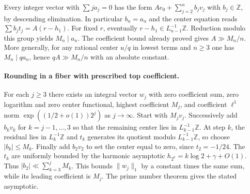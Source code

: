 \documentclass[11pt,a4paper,oneside,openany]{report}
\theoremstyle{remark}\newtheorem{remark}[theorem]{Remark}
\numberwithin{equation}{section}
\begin{document}
Every integer vector with $\sum j a_j=0$ has the form
$A e_0+\sum_{j=2}^n b_j v_j$ with $b_j\in\mathbb Z$, by descending
elimination. In particular $b_n=a_n$ and the center equation reads
$\sum b_jt_j=A(r-h_1)$. For fixed $r$, eventually $r-h_1\in
L_{n-1}^{-1}\mathbb Z$. Reduction modulo this group yields $M_n\mid a_n$.
The coefficient bound already proved gives $A\gg M_n/n$. More generally,
for any rational center $u/q$ in lowest terms and $n\ge3$ one has
$M_n\mid q a_n$, hence $qA\gg M_n/n$ with an absolute constant.

\paragraph{Rounding in a fiber with prescribed top coefficient.}
For each $j\ge3$ there exists an integral vector $w_j$ with zero
coefficient sum, zero logarithm and zero center functional, highest
coefficient $M_j$, and coefficient $\ell^1$ norm
$\exp((1/2+o(1))2^j)$ as $j\to\infty$. Start with $M_j v_j$.
Successively add $b_k v_k$ for $k=j-1,\ldots,3$ so that the remaining
center lies in $L_{k-1}^{-1}\mathbb Z$. At step $k$, the residual lies
in $L_k^{-1}\mathbb Z$ and $t_k$ generates its quotient modulo
$L_{k-1}^{-1}\mathbb Z$, so choose $|b_k|\le M_k$. Finally add $b_2v_2$
to set the center equal to zero, since $t_2=-1/24$. The $t_k$ are
uniformly bounded by the harmonic asymptotic $h_{2^k}=k\log2+\gamma+O(1)$.
Thus $|b_2|\ll\sum_{k=3}^jM_k$. This bounds $\|w_j\|_1$ by a constant
times the same sum, while its leading coefficient is $M_j$. The prime
number theorem gives the stated asymptotic.
\end{document}
